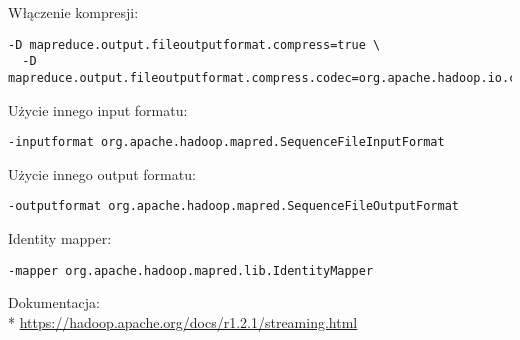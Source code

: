 \documentclass{article}
\begin{document}
Włączenie kompresji:
\begin{lstlisting}
-D mapreduce.output.fileoutputformat.compress=true \
  -D mapreduce.output.fileoutputformat.compress.codec=org.apache.hadoop.io.compress.GzipCodec
\end{lstlisting} 
Użycie innego input formatu:
\begin{lstlisting}
-inputformat org.apache.hadoop.mapred.SequenceFileInputFormat
\end{lstlisting}
Użycie innego output formatu:
\begin{lstlisting}
-outputformat org.apache.hadoop.mapred.SequenceFileOutputFormat
\end{lstlisting}
Identity mapper:
\begin{lstlisting}
-mapper org.apache.hadoop.mapred.lib.IdentityMapper
\end{lstlisting}

Dokumentacja:
\\*
\url{https://hadoop.apache.org/docs/r1.2.1/streaming.html}
\end{document}
